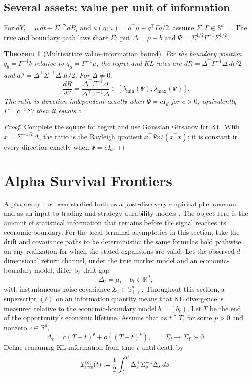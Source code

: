 \documentclass[11pt]{article}
\numberwithin{equation}{section}
\theoremstyle{plain}
\newtheorem{theorem}{Theorem}[section]
\theoremstyle{definition}
\theoremstyle{remark}
\begin{document}
\subsection{Several assets: value per unit of information}\label{multivariate-economicinformation-spectrum}
For $dY_t=\mu\,dt+\Sigma^{1/2}dB_t$ and $u(q;\mu)=q^\top\mu-q^\top\Gamma q/2$, assume $\Sigma,\Gamma\in\mathbb S_{++}^d$. The true and boundary path laws share $\Sigma$; put $\Delta=\mu-b$ and $\Psi=\Sigma^{1/2}\Gamma^{-1}\Sigma^{1/2}$.
\begin{theorem}[Multivariate value--information bound]
For the boundary position $q_b=\Gamma^{-1}b$ relative to $q_\mu=\Gamma^{-1}\mu$, the regret and KL rates are $dR=\Delta^\top\Gamma^{-1}\Delta\,dt/2$ and $d\mathcal I=\Delta^\top\Sigma^{-1}\Delta\,dt/2$. For $\Delta\ne0$,
\[
\frac{dR}{d\mathcal I}
=\frac{\Delta^\top\Gamma^{-1}\Delta}{\Delta^\top\Sigma^{-1}\Delta}
\in[\lambda_{\min}(\Psi),\lambda_{\max}(\Psi)].
\]
The ratio is direction-independent exactly when $\Psi=cI_d$ for $c>0$, equivalently $\Gamma=c^{-1}\Sigma$; then it equals $c$.
\end{theorem}
\begin{proof} Complete the square for regret and use Gaussian Girsanov for KL. With $x=\Sigma^{-1/2}\Delta$, the ratio is the Rayleigh quotient $x^\top\Psi x/(x^\top x)$; it is constant in every direction exactly when $\Psi=cI_d$.\end{proof}

\section{Alpha Survival Frontiers}\label{alpha-survival-frontiers}

Alpha decay has been studied both as a post-discovery empirical phenomenon and as an input to trading and strategy-durability models \cite{penasse2022,masmith2025,varma2026,zulfiqar2026,alexanderfabozzi2026}. The object here is the amount of statistical information that remains before the signal reaches its economic boundary.  For the local terminal asymptotics in this section, take the drift and covariance paths to be deterministic; the same formulas hold pathwise on any realization for which the stated expansions are valid.  Let the observed $d$-dimensional return channel, under the true market model and an economic-boundary model, differ by drift gap
\[
\Delta_t=\mu_t-b_t\in\mathbb R^d,
\]
with instantaneous noise covariance $\Sigma_t\in\mathbb S_{++}^d$. Throughout this section, a superscript $(b)$ on an information quantity means that KL divergence is measured relative to the economic-boundary model $b=(b_t)$. Let \(T\) be
the end of the opportunity's economic lifetime. Assume that as \(t\uparrow T\), for some
\(p>0\) and nonzero \(c\in\mathbb R^d\), \[
\Delta_t=c(T-t)^p+o((T-t)^p),
\qquad
\Sigma_t\to\Sigma_T\succ0.
\] Define remaining KL information from time \(t\) until death by \[
\mathcal I_{\rm rem}^{(b)}(t)
:=\frac12\int_t^T
\Delta_s^\top\Sigma_s^{-1}\Delta_s\,ds.
\]
\end{document}
